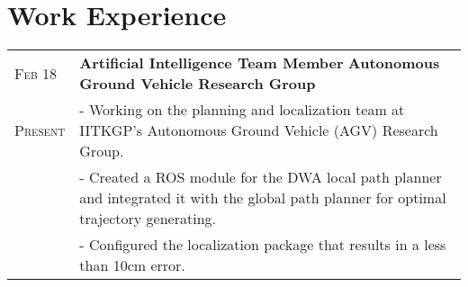 \documentclass[a4paper,10pt]{extarticle} %
\begin{document}
\section{\textcolor{primary}{Work Experience}}

\begin{tabularx}{\linewidth}{ l | X }


\textsc{Feb 18} & \textbf{Artificial Intelligence Team Member} \hfill\textbf{Autonomous Ground Vehicle Research Group}\\
\textsc{Present} & {- Working on the planning and localization team at IITKGP's Autonomous Ground Vehicle (AGV) Research Group.}\\
& {- Created a ROS module for the DWA local path planner and integrated it with the global path planner for optimal trajectory generating.}\\
& {- Configured the localization package that results in a less than 10cm error.}
\end{tabularx}


\vspace{0.2cm}
\end{document}

